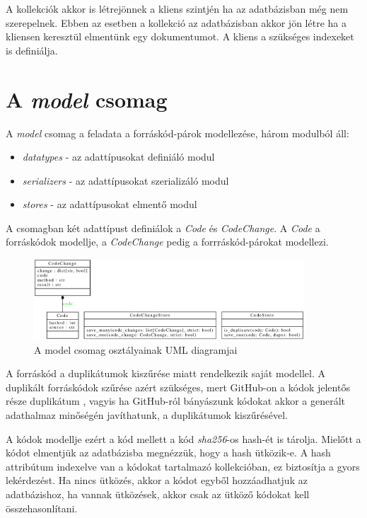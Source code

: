 A kollekciók akkor is létrejönnek a kliens szintjén ha az adatbázisban még nem szerepelnek.
Ebben az esetben a kollekció az adatbázisban akkor jön létre ha a kliensen keresztül elmentünk egy dokumentumot.
A kliens a szükséges indexeket is definiálja.

\section{A \emph{model} csomag}

A \emph{model} csomag a feladata a forráskód-párok modellezése, három modulból áll:

\begin{itemize}
	\item \emph{datatypes} - az adattípusokat definiáló modul
	\item \emph{serializers} - az adattípusokat szerializáló modul
	\item \emph{stores} - az adattípusokat elmentő modul
\end{itemize}

A csomagban két adattípust definiálok a \emph{Code} és \emph{CodeChange}.
A \emph{Code} a forráskódok modellje, a \emph{CodeChange} pedig a forrráskód-párokat modellezi.

\begin{figure}[H]
	\centering
	\includegraphics[width=0.9\textwidth]{images/uml/models.eps}
	\caption{A model csomag osztályainak UML diagramjai}
\end{figure}

A forráskód a duplikátumok kiszűrése miatt rendelkezik saját modellel.
A duplikált forráskódok szűrése azért szükséges, mert GitHub-on a kódok jelentős része duplikátum
\cite{gitubDuplication},
vagyis ha GitHub-ról bányászunk kódokat akkor a generált adathalmaz minőségén javíthatunk,
a duplikátumok kiszűrésével.

A kódok modellje ezért a kód mellett a kód \emph{sha256}-os hash-ét is tárolja.
Mielőtt a kódot elmentjük az adatbázisba megnézzük, hogy a hash ütközik-e.
A hash attribútum indexelve van a kódokat tartalmazó kollekcióban, ez biztosítja a gyors lekérdezést.
Ha nincs ütközés, akkor a kódot egyből hozzáadhatjuk az adatbázishoz,
ha vannak ütközések, akkor csak az ütköző kódokat kell összehasonlítani.

